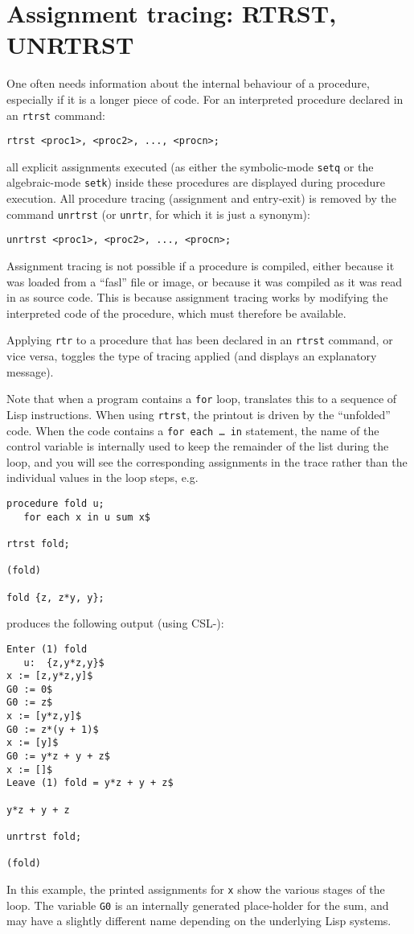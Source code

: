 \section{Assignment tracing: RTRST, UNRTRST}

\hypertarget{command:RTRST}{}
\hypertarget{command:UNRTRST}{}
One often needs information about the internal behaviour of a
procedure, especially if it is a longer piece of code.  For an
interpreted procedure declared in an \texttt{rtrst} command:
\begin{verbatim}
rtrst <proc1>, <proc2>, ..., <procn>;
\end{verbatim}
all explicit assignments executed (as either the symbolic-mode
\texttt{setq} or the algebraic-mode \texttt{setk})
inside these procedures are displayed during procedure execution.  All
procedure tracing (assignment and entry-exit) is removed by the
command \texttt{unrtrst} (or \texttt{unrtr}, for which it is just a
synonym):
\begin{verbatim}
unrtrst <proc1>, <proc2>, ..., <procn>;
\end{verbatim}
Assignment tracing is not possible if a procedure is compiled, either
because it was loaded from a ``fasl'' file or image, or because it was
compiled as it was read in as source code.  This is because assignment
tracing works by modifying the interpreted code of the procedure,
which must therefore be available.

Applying \texttt{rtr} to a procedure that has been declared in an
\texttt{rtrst} command, or vice versa, toggles the type of tracing
applied (and displays an explanatory message).

Note that when a program contains a \texttt{for} loop, \REDUCE{}
translates this to a sequence of Lisp instructions.  When using
\texttt{rtrst}, the printout is driven by the ``unfolded'' code.  When
the code contains a \texttt{for each \ldots{} in} statement, the name
of the control variable is internally used to keep the remainder of
the list during the loop, and you will see the corresponding
assignments in the trace rather than the individual values in the loop
steps, e.g.
\begin{verbatim}
procedure fold u;
   for each x in u sum x$

rtrst fold;

(fold)

fold {z, z*y, y};
\end{verbatim}
produces the following output (using CSL-\REDUCE{}):
\begin{verbatim}
Enter (1) fold
   u:  {z,y*z,y}$
x := [z,y*z,y]$
G0 := 0$
G0 := z$
x := [y*z,y]$
G0 := z*(y + 1)$
x := [y]$
G0 := y*z + y + z$
x := []$
Leave (1) fold = y*z + y + z$

y*z + y + z

unrtrst fold;

(fold)
\end{verbatim}
In this example, the printed assignments for \texttt{x} show the
various stages of the loop.  The variable \texttt{G0} is an internally
generated place-holder for the sum, and may have a slightly different
name depending on the underlying Lisp systems.

